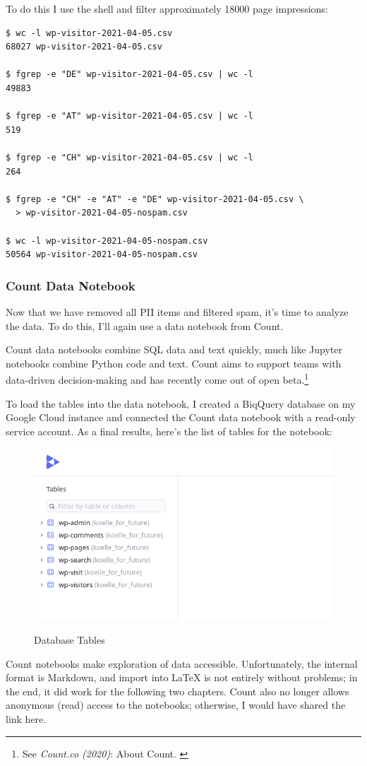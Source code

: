 To do this I use the shell and filter approximately 18000 page impressions:

\begin{lstlisting}[caption=Removing Spam, frame=single, basicstyle=\ttfamily]
$ wc -l wp-visitor-2021-04-05.csv
68027 wp-visitor-2021-04-05.csv

$ fgrep -e "DE" wp-visitor-2021-04-05.csv | wc -l
49883

$ fgrep -e "AT" wp-visitor-2021-04-05.csv | wc -l
519

$ fgrep -e "CH" wp-visitor-2021-04-05.csv | wc -l
264

$ fgrep -e "CH" -e "AT" -e "DE" wp-visitor-2021-04-05.csv \
  > wp-visitor-2021-04-05-nospam.csv

$ wc -l wp-visitor-2021-04-05-nospam.csv 
50564 wp-visitor-2021-04-05-nospam.csv
\end{lstlisting}

\subsubsection{Count Data Notebook}

Now that we have removed all PII items and filtered spam, it's time to analyze the data. To do this, I'll again use a data notebook from Count.

Count data notebooks combine SQL data and text quickly, much like Jupyter notebooks combine Python code and text. Count aims to support teams with data-driven decision-making and has recently come out of open beta.\footnote{See \textit{Count.co (2020)}: About Count. \cite{aboutCount}}

To load the tables into the data notebook, I created a BiqQuery database on my Google Cloud instance and connected the Count data notebook with a read-only service account. As a final results, here's the list of tables for the notebook:

\begin{figure}[H]
\centering
\caption {Database Tables}
\includegraphics[width=\linewidth]{images/tables.png}
\label{fig:tablesCount}
\end{figure}

Count notebooks make exploration of data accessible. Unfortunately, the internal format is Markdown, and import into LaTeX is not entirely without problems; in the end, it did work for the following two chapters. Count also no longer allows anonymous (read) access to the notebooks; otherwise, I would have shared the link here.
